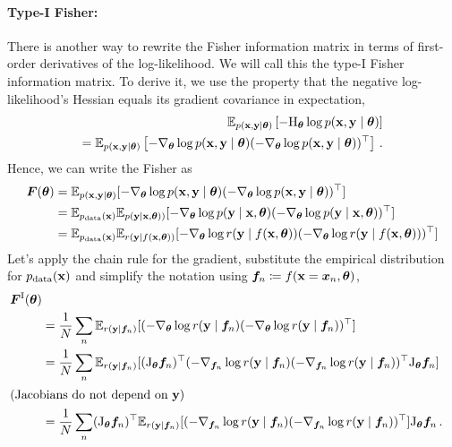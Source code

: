 \paragraph{Type-I Fisher:} There is another way to rewrite the Fisher information matrix in terms of first-order derivatives of the log-likelihood.
We will call this the type-I Fisher information matrix.
To derive it, we use the property that the negative log-likelihood's Hessian equals its gradient covariance in expectation,
\begin{align*}
  \mathbb{E}_{p({\mathbf{x}}, {\mathbf{y}} \mid {\bm{\theta}})}
  \left[
  -\mathrm{H}_{{\bm{\theta}}} \log p({\mathbf{x}}, {\mathbf{y}} \mid {\bm{\theta}})
  \right]
  \\
  =
  \mathbb{E}_{p({\mathbf{x}}, {\mathbf{y}} \mid {\bm{\theta}})}
  \left[
  -\nabla_{{\bm{\theta}}} \log p({\mathbf{x}}, {\mathbf{y}} \mid {\bm{\theta}})
  (-\nabla_{{\bm{\theta}}} \log p({\mathbf{x}}, {\mathbf{y}}\mid  {\bm{\theta}}))^{\top}
  \right]\,.
\end{align*}
Hence, we can write the Fisher as
\begin{align*}
  {\bm{F}}({\bm{\theta}}) &=
                 \mathbb{E}_{p({\mathbf{x}}, {\mathbf{y}} \mid {\bm{\theta}})} [-\nabla_{{\bm{\theta}}} \log p({\mathbf{x}}, {\mathbf{y}} \mid {\bm{\theta}}) (-\nabla_{{\bm{\theta}}} \log p({\mathbf{x}}, {\mathbf{y}} \mid {\bm{\theta}}))^{\top}]
  \\
               &= \mathbb{E}_{p_{\text{data}}({\mathbf{x}})}\mathbb{E}_{p({\mathbf{y}} \mid {\mathbf{x}}, {\bm{\theta}}))}
                 [-\nabla_{{\bm{\theta}}} \log p({\mathbf{y}} \mid {\mathbf{x}}, {\bm{\theta}}) (-\nabla_{{\bm{\theta}}} \log p({\mathbf{y}} \mid {\mathbf{x}}, {\bm{\theta}}))^{\top}]
  \\
               &= \mathbb{E}_{p_{\text{data}}({\mathbf{x}})}\mathbb{E}_{r({\mathbf{y}} \mid f({\mathbf{x}}, {\bm{\theta}}))}
                 [-\nabla_{{\bm{\theta}}} \log r({\mathbf{y}} \mid f({\mathbf{x}}, {\bm{\theta}})) (-\nabla_{{\bm{\theta}}} \log r({\mathbf{y}} \mid f({\mathbf{x}}, {\bm{\theta}})))^{\top}]
\end{align*}
Let's apply the chain rule for the gradient, substitute the empirical distribution for $p_{\text{data}}({\mathbf{x}})$ and simplify the notation using ${\bm{f}}_n \coloneqq f({\mathbf{x}} = {\bm{x}}_n, {\bm{\theta}})$,
\begin{align*}
  {\bm{F}}^{\text{I}}({\bm{\theta}})
  \\
  &=
    \frac{1}{N} \sum_n
    \mathbb{E}_{r({\mathbf{y}} \mid {\bm{f}}_n)}
    [
    (-\nabla_{{\bm{\theta}}} \log r({\mathbf{y}} \mid {\bm{f}}_n) (-\nabla_{{\bm{\theta}}} \log r({\mathbf{y}} \mid {\bm{f}}_n))^{\top}
    ]
  \\
  &=
    \frac{1}{N} \sum_n
    \mathbb{E}_{r({\mathbf{y}} \mid {\bm{f}}_n)}
    [
    (\mathrm{J}_{{\bm{\theta}}}{\bm{f}}_n)^{\top}
    (-\nabla_{{\bm{f}}_n} \log r({\mathbf{y}} \mid {\bm{f}}_n) (-\nabla_{{\bm{f}}_n} \log r({\mathbf{y}} \mid {\bm{f}}_n))^{\top}
    \mathrm{J}_{{\bm{\theta}}}{\bm{f}}_n
    ]
  \\
  \shortintertext{(Jacobians do not depend on ${\mathbf{y}}$)}
  &=
    \frac{1}{N} \sum_n
    (\mathrm{J}_{{\bm{\theta}}}{\bm{f}}_n)^{\top}
    \mathbb{E}_{r({\mathbf{y}} \mid {\bm{f}}_n)}
    [
    (-\nabla_{{\bm{f}}_n} \log r({\mathbf{y}} \mid {\bm{f}}_n) (-\nabla_{{\bm{f}}_n} \log r({\mathbf{y}} \mid {\bm{f}}_n))^{\top}
    ]
    \mathrm{J}_{{\bm{\theta}}}{\bm{f}}_n \,.
\end{align*}

